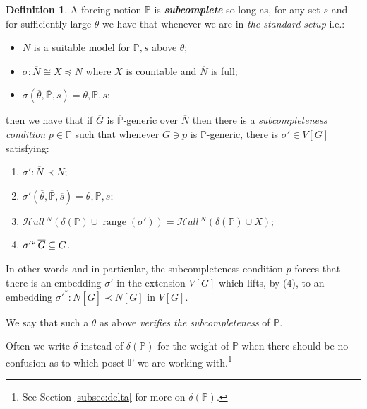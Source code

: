 \documentclass{amsart}
\theoremstyle{definition}
\newtheorem{definition}[theorem]{Definition}
\theoremstyle{remark}
\renewcommand{\P}{\mathbb{P}}
\newcommand{\N}{{\overline{N}}}
\newcommand{\G}{\overline{G}}
\DeclareMathOperator{\ran}{range}
\newcommand{\SH}{\mathcal{H}\textit{ull} \,}
\newcommand{\sk}[3]{\SH^{#1}( {#2} \cup {\ran(#3)} ) }
\newcommand{\Sk}[3]{\SH^{#1}( {#2} \cup {#3} ) }
\begin{document}
\begin{definition} \label{definition:SC}
A forcing notion $\P$ is \emph{\textbf{subcomplete}} so long as, for any set $s$ and 
for sufficiently large $\theta$ we have that whenever we are in \emph{the standard setup} i.e.: \begin{itemize}
	\item $N$ is a suitable model for $\P,s$ above $\theta$;
	\item $\sigma: \N \cong X \preccurlyeq N$ where $X$ is countable and $\N$ is full;
	\item $\sigma(\overline \theta, \overline{\P}, \overline s)=\theta, \P, s$;
\end{itemize}
then we have that if $\G$ is  $\overline{\P}$-generic over $\N$ then there is a \emph{subcompleteness condition} $p \in \P$ such that whenever $G \ni p$ is $\P$-generic, there is $\sigma' \in V[G]$ satisfying: \begin{enumerate}
	\item $\sigma': \N \prec N$;
	\item $\sigma'(\overline \theta, \overline{\P}, \overline s)=\theta, \P, s$;
	\item \label{item:skolemcompatibility} $\sk{N}{\delta(\P)}{\sigma'} = \Sk{N}{\delta(\P)}{X}$;
	\item  \label{item:sigmaprimelifts}$\sigma'``\, \G \subseteq G$.
\end{enumerate}
In other words and in particular, the subcompleteness condition $p$ forces that there is an embedding $\sigma'$ in the extension $V[G]$ which lifts, by (4), to an embedding $\sigma'^*:\N[\G] \prec N[G]$ in $V[G]$.

We say that such a $\theta$ as above \textit{verifies the subcompleteness} of $\P$.

Often we write $\delta$ instead of $\delta(\P)$ for the weight of $\P$ when there should be no confusion as to which poset $\P$ we are working with.\footnote{See Section \ref{subsec:delta} for more on $\delta(\P)$.}
\end{definition}
\end{document}
